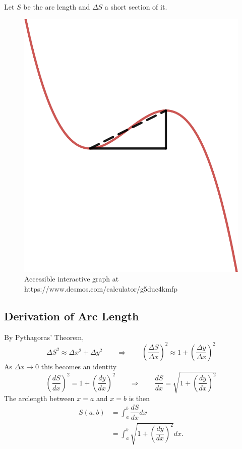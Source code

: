 \documentclass[
  12pt,
  a4paper]{article}
\begin{document}
Let \(S\) be the arc length and \(\Delta S\) a short section of it.

\begin{figure}
\includegraphics[height=0.2\textheight]{arclengthdx} \caption{Accessible interactive graph at https://www.desmos.com/calculator/g5duc4kmfp}\label{fig:unnamed-chunk-2}
\end{figure}

\hypertarget{derivation-of-arc-length}{%
\subsection{Derivation of Arc Length}\label{derivation-of-arc-length}}

By Pythagoras' Theorem, \[
\Delta S^2 \approx \Delta x^2+\Delta y^2
\qquad \Rightarrow\qquad
\left(\dfrac{\Delta S}{\Delta x}\right)^2 \approx 1+\left(\dfrac{\Delta y}{\Delta x}\right)^2
\] As \(\Delta x\to0\) this becomes an identity \[
\left(\dfrac{dS}{dx}\right)^2 = 1+\left(\dfrac{dy}{dx}\right)^2
\qquad\Rightarrow\qquad
\dfrac{dS}{dx} = \sqrt{1+\left(\dfrac{dy}{dx}\right)^2}
\] The arclength between \(x=a\) and \(x=b\) is then \[
\begin{aligned}
  S(a,b) &= \int_a^b\dfrac{dS}{dx}dx\\
  &= \int_a^b\sqrt{1+\left(\dfrac{dy}{dx}\right)^2}dx.
\end{aligned}
\]
\end{document}
